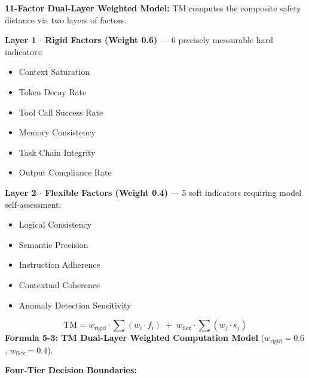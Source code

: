 \documentclass[11pt,a4paper]{article}
\begin{document}
\textbf{11-Factor Dual-Layer Weighted Model:} TM computes the composite safety distance via two layers of factors.

\smallskip
\noindent\textbf{Layer 1 $\cdot$ Rigid Factors (Weight 0.6)} --- 6 precisely measurable hard indicators:
\begin{itemize}
  \item Context Saturation
  \item Token Decay Rate
  \item Tool Call Success Rate
  \item Memory Consistency
  \item Task Chain Integrity
  \item Output Compliance Rate
\end{itemize}

\noindent\textbf{Layer 2 $\cdot$ Flexible Factors (Weight 0.4)} --- 5 soft indicators requiring model self-assessment:
\begin{itemize}
  \item Logical Consistency
  \item Semantic Precision
  \item Instruction Adherence
  \item Contextual Coherence
  \item Anomaly Detection Sensitivity
\end{itemize}

\begin{equation}\label{eq:tm-weighted}
\text{TM} = w_{\text{rigid}} \cdot \sum(w_i \cdot f_i) \;+\; w_{\text{flex}} \cdot \sum(w_j \cdot s_j)
\end{equation}
\smallskip
\noindent\textbf{Formula 5-3: TM Dual-Layer Weighted Computation Model} ($w_{\text{rigid}}=0.6$, $w_{\text{flex}}=0.4$).

\smallskip
\noindent\textbf{Four-Tier Decision Boundaries:}

\begin{center}
\end{center}
\end{document}
